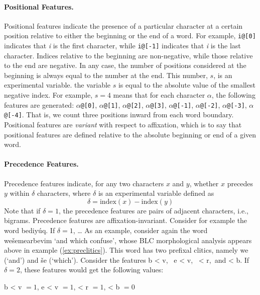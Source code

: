 \paragraph{Positional Features.}
Positional features
indicate the presence of a particular
character at a certain position relative to either the beginning or the end of 
a word. For example, \texttt{i@[0]} indicates that \textit{i} is the first 
character, while \texttt{i@[-1]} indicates that \textit{i} is the last character. 
Indices relative to the beginning are non-negative, while those relative 
to the end are negative. In any case, the number of positions considered 
at the beginning is always equal to the number at the end. This number, 
$s$, is an experimental variable.
the variable $s$ is equal to the absolute value of the smallest negative index. 
For example, $s=4$ means that for each character $\alpha$, the following 
features are generated: $\alpha$\texttt{@[0]}, $\alpha$\texttt{@[1]}, 
$\alpha$\texttt{@[2]}, $\alpha$\texttt{@[3]}, $\alpha$\texttt{@[-1]}, $\alpha$\texttt{@[-2]}, 
$\alpha$\texttt{@[-3]}, $\alpha$\texttt{@[-4]}.
That is, we count three positions inward from each word boundary.
Positional features are \emph{variant} 
with respect to affixation, which is to say that positional features are 
defined relative to the absolute beginning 
or end of a given word. 

\paragraph{Precedence Features.}
Precedence features indicate, for any two characters $x$ and $y$,
whether $x$ precedes $y$ within $\delta$ characters,
where $\delta$ is an experimental variable defined as
	\begin{equation}\label{eq:indexdif}
	\delta = \text{index}(x) - \text{index}(y)
	\end{equation}
Note that if $\delta = 1$, the precedence features are 
pairs of adjacent characters, i.e., bigrams.
Precedence features are affixation-invariant. 
Consider for example the word \textsf{bediy\'uq}. 
If $\delta = 1$, \dots 
As an example, consider again the word 
\textsf{we\v{s}emearbevim} `and which confuse', 
whose \ac{BLC} morphological 
analysis appears above in example (\ref{ex:preclitics}). 
This word has two prefixal clitics, namely \textsf{we} 
(`and') and \textsf{\v{s}e} (`which'). %
Consider the features \textsf{b < v}, \, \textsf{e < v}, \,\textsf{ < r},\, and \textsf{ < b}. If $\delta=2$, these features would get the 
following values: 
\begin{exe}	
	\ex \textsf{b < v} $ =1 $, \qquad \textsf{e < v} $ =1 $, \qquad\textsf{ < r} $ =1$, \qquad \textsf{< b} $=0$
\end{exe}

